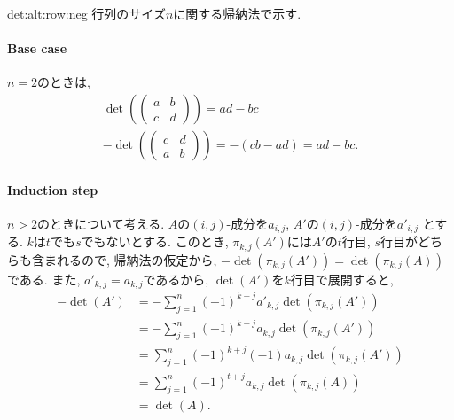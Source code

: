 \begin{proofof}{det:alt:row:neg}
  行列のサイズ$n$に関する帰納法で示す.
  \paragraph{Base case}
  $n=2$のときは,
  \begin{align*}
    \det(
    \begin{pmatrix}
      a&b\\
      c&d
    \end{pmatrix}
    )=ad-bc\\
    -\det(
    \begin{pmatrix}
      c&d\\
      a&b
    \end{pmatrix}
    )=-(cb-ad)=ad-bc.
  \end{align*}

    \paragraph{Induction step}
  $n>2$のときについて考える.
  $A$の$(i,j)$-成分を$a_{i,j}$,
  $A'$の$(i,j)$-成分を$a'_{i,j}$
  とする.
  $k$は$t$でも$s$でもないとする.
  このとき,
  $\pi_{k,j}(A')$には$A'$の$t$行目, $s$行目がどちらも含まれるので,
  帰納法の仮定から,
  $-\det(\pi_{k,j}(A'))=\det(\pi_{k,j}(A))$
  である.
  また, $a'_{k,j}=a_{k,j}$であるから,
  $\det(A')$を$k$行目で展開すると,
  \begin{align*}
    -\det(A')
    &=-\sum_{j=1}^{n} (-1)^{k+j} a'_{k,j}\det(\pi_{k,j}(A'))\\
    &=-\sum_{j=1}^{n} (-1)^{k+j} a_{k,j}\det(\pi_{k,j}(A'))\\
    &=\sum_{j=1}^{n} (-1)^{k+j} (-1) a_{k,j}\det(\pi_{k,j}(A'))\\
    &=\sum_{j=1}^{n} (-1)^{t+j}a_{k,j}\det(\pi_{k,j}(A))\\
    &=\det(A).
  \end{align*}
\end{proofof}

